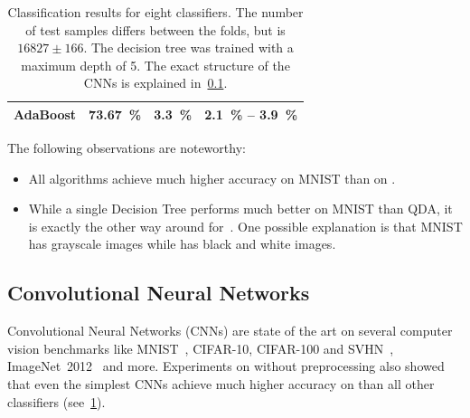 \begin{table}[h]
\begin{tabular}{lrrr}
    AdaBoost      & \SI{73.67}{\percent} &  \SI{3.3}{\percent} & \SI{2.1}{\percent} -- \hphantom{0}\SI{3.9}{\percent}\\%
    \bottomrule
    \end{tabular}
    \caption{Classification results for eight classifiers.
             The number of
             test samples differs between the folds, but is $\num{16827} \pm
             166$. The decision tree
             was trained with a maximum depth of 5. The exact structure
             of the CNNs is explained in~\cref{subsec:CNNs-Classification}.}
    \label{table:classifier-results}
\end{table}

The following observations are noteworthy:
\begin{itemize}
    \item All algorithms achieve much higher accuracy on MNIST than on
          \dbNameVersion{}.
    \item While a single Decision Tree performs much better on MNIST than
          QDA, it is exactly the other way around for~\dbName{}. One possible
          explanation is that MNIST has grayscale images while \dbName{} has
          black and white images.
\end{itemize}


\subsection{Convolutional Neural Networks}\label{subsec:CNNs-Classification}
Convolutional Neural Networks (CNNs) are state of the art on several computer
vision benchmarks like MNIST~\cite{wan2013regularization}, CIFAR-10, CIFAR-100
and SVHN~\cite{huang2016densely},
ImageNet~2012~\cite{deep-residual-networks-2015} and more. Experiments on
\dbNameVersion{} without preprocessing also showed that even the
simplest CNNs achieve much higher accuracy on \dbNameVersion{} than all other
classifiers (see~\cref{table:classifier-results}).

